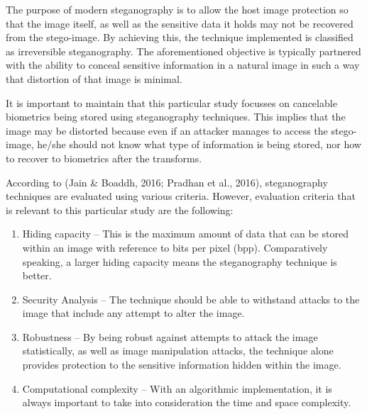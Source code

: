 The purpose of modern steganography is to allow the host image protection so that the image itself, as well as the sensitive data it holds may not be recovered from the stego-image. By achieving this, the technique implemented is classified as irreversible steganography. The aforementioned objective is typically partnered with the ability to conceal sensitive information in a natural image in such a way that distortion of that image is minimal.

It is important to maintain that this particular study focusses on cancelable biometrics being stored using steganography techniques. This implies that the image may be distorted because even if an attacker manages to access the stego-image, he/she should not know what type of information is being stored, nor how to recover to biometrics after the transforms. 

According to (Jain \& Boaddh, 2016; Pradhan et al., 2016), steganography techniques are evaluated using various criteria. However, evaluation criteria that is relevant to this particular study are the following:

\begin{enumerate}[label=\roman*.]
	
	\item Hiding capacity – This is the maximum amount of data that can be stored within an image with reference to bits per pixel (bpp). Comparatively speaking, a larger hiding capacity means the steganography technique is better.
	
	\item Security Analysis – The technique should be able to withstand attacks to the image that include any attempt to alter the image.
	
	\item Robustness – By being robust against attempts to attack the image statistically, as well as image manipulation attacks, the technique alone provides protection to the sensitive information hidden within the image. 
	
	\item Computational complexity – With an algorithmic implementation, it is always important to take into consideration the time and space complexity.

\end{enumerate}
	
